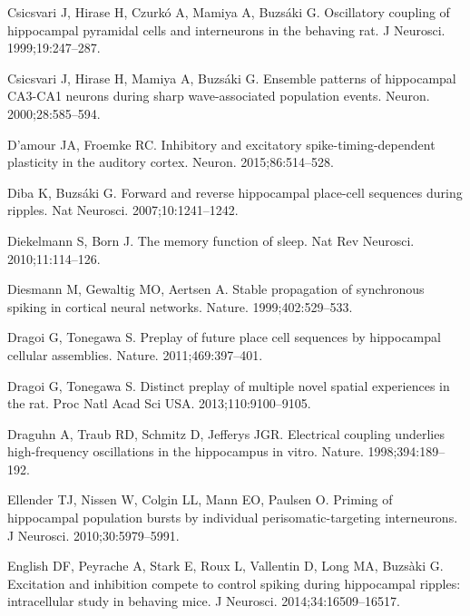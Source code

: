 \begin{thebibliography}{}
Csicsvari J, Hirase H, Czurk\'{o} A, Mamiya A, Buzs\'{a}ki G.
\newblock Oscillatory coupling of hippocampal pyramidal cells and interneurons in the behaving rat.
\newblock J Neurosci. 1999;19:247--287.

Csicsvari J, Hirase H, Mamiya A, Buzs\'{a}ki G.
\newblock Ensemble patterns of hippocampal CA3-CA1 neurons during sharp wave-associated population events.
\newblock Neuron. 2000;28:585--594.

D'amour JA, Froemke RC.
\newblock Inhibitory and excitatory spike-timing-dependent plasticity in the auditory cortex.
\newblock Neuron. 2015;86:514--528.


Diba K, Buzs\'{a}ki G.
\newblock Forward and reverse hippocampal place-cell sequences during ripples.
\newblock Nat Neurosci. 2007;10:1241--1242.

Diekelmann S, Born J.
\newblock The memory function of sleep.
\newblock Nat Rev Neurosci. 2010;11:114--126.

Diesmann M, Gewaltig MO, Aertsen A.
\newblock Stable propagation of synchronous spiking in cortical neural
  networks.
\newblock Nature. 1999;402:529--533.

Dragoi G, Tonegawa S.
\newblock Preplay of future place cell sequences by hippocampal cellular assemblies.
\newblock Nature. 2011;469:397--401.

Dragoi G, Tonegawa S.
\newblock Distinct preplay of multiple novel spatial experiences in the rat.
\newblock Proc Natl Acad Sci USA. 2013;110:9100--9105.

Draguhn A, Traub RD, Schmitz D, Jefferys JGR. 
\newblock Electrical coupling underlies high-frequency oscillations in the hippocampus in vitro.
\newblock Nature. 1998;394:189--192.

Ellender TJ, Nissen W, Colgin LL, Mann EO, Paulsen O.
\newblock Priming of hippocampal population bursts by individual perisomatic-targeting interneurons.
\newblock J Neurosci. 2010;30:5979--5991.

  English DF, Peyrache A, Stark E, Roux L, Vallentin D, Long MA, Buzs\`{a}ki G.
\newblock Excitation and inhibition compete to control spiking during hippocampal ripples: intracellular study in behaving mice.
\newblock J Neurosci. 2014;34:16509--16517.


\end{thebibliography}
